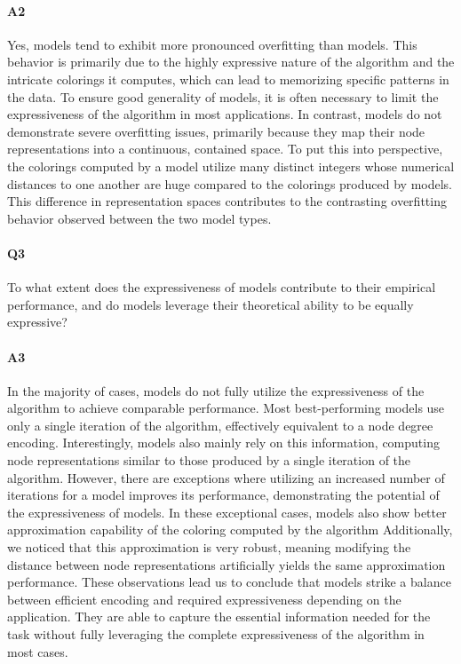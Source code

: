 \paragraph{A2} Yes, \textsf{\wlnn} models tend to exhibit more pronounced overfitting than \textsf{\gnn} models. This behavior is primarily due to the highly expressive nature of the \wl algorithm and the intricate colorings it computes, which can lead to memorizing specific patterns in the data. To ensure good generality of \wlnn models, it is often necessary to limit the expressiveness of the \wl algorithm in most applications. In contrast, \gnn models do not demonstrate severe overfitting issues, primarily because they map their node representations into a continuous, contained space. To put this into perspective, the colorings computed by a \wlnn model utilize many distinct integers whose numerical distances to one another are huge compared to the colorings produced by \gnn models. This difference in representation spaces contributes to the contrasting overfitting behavior observed between the two model types.

\paragraph{Q3} To what extent does the expressiveness of \wlnn models contribute to their empirical performance, and do \gnn models leverage their theoretical ability to be equally expressive?

\vspace{-15pt}

\paragraph{A3} In the majority of cases, \wlnn models do not fully utilize the expressiveness of the \wl algorithm to achieve comparable performance. Most best-performing \wlnn models use only a single iteration of the \wl algorithm, effectively equivalent to a node degree encoding. Interestingly, \gnn models also mainly rely on this information, computing node representations similar to those produced by a single iteration of the \wl algorithm. However, there are exceptions where utilizing an increased number of \wl iterations for a \wlnn model improves its performance, demonstrating the potential of the expressiveness of \wlnn models. In these exceptional cases, \gnn models also show better approximation capability of the coloring computed by the \wl algorithm Additionally, we noticed that this approximation is very robust, meaning modifying the distance between node representations artificially yields the same approximation performance. These observations lead us to conclude that \gnn models strike a balance between efficient encoding and required expressiveness depending on the application. They are able to capture the essential information needed for the task without fully leveraging the complete expressiveness of the \wl algorithm in most cases.

